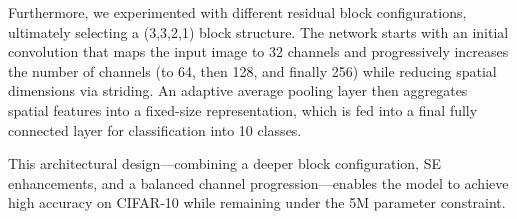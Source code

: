 \documentclass[letterpaper]{article}
\begin{document}
Furthermore, we experimented with different residual block configurations, ultimately selecting a (3,3,2,1) block structure. The network starts with an initial convolution that maps the input image to 32 channels and progressively increases the number of channels (to 64, then 128, and finally 256) while reducing spatial dimensions via striding. An adaptive average pooling layer then aggregates spatial features into a fixed-size representation, which is fed into a final fully connected layer for classification into 10 classes.

This architectural design—combining a deeper block configuration, SE enhancements, and a balanced channel progression—enables the model to achieve high accuracy on CIFAR‑10 while remaining under the 5M parameter constraint.

\begin{figure}[ht]
\centering
{}
\end{figure}
\end{document}
